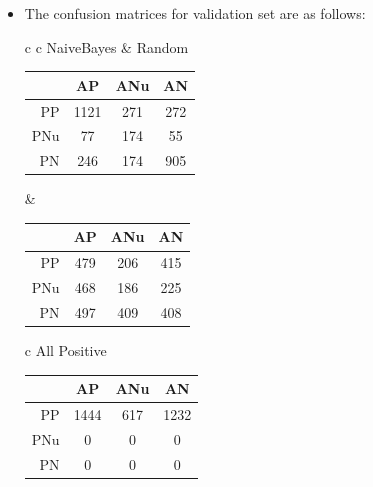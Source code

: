 \documentclass[12pt]{article}
\begin{document}
\begin{enumerate}[label=(\alph*)]
\begin{itemize}
\begin{center}
\begin{tabular}{c}
\begin{tabular}{r|c|c|c}
                    \hline
                    PN & 0 & 0 & 0 \\
                    \hline
                \end{tabular}
            \end{tabular}
            \end{center}
        \item The confusion matrices for validation set are as follows:
        \begin{center}
            \begin{tabular}{c c}
                NaiveBayes & Random \\
                \begin{tabular}{r|c|c|c}
                    & AP & ANu & AN \\
                    \hline
                    PP & 1121 & 271 & 272\\
                    \hline
                    PNu & 77 & 174 & 55 \\
                    \hline
                    PN & 246 & 174 & 905 \\
                    \hline
                \end{tabular} & 
                \begin{tabular}{r|c|c|c}
                    & AP & ANu & AN \\
                    \hline
                    PP & 479 & 206 & 415\\
                    \hline
                    PNu & 468 & 186 & 225 \\
                    \hline
                    PN & 497 & 409 & 408 \\
                    \hline
                \end{tabular}
            \end{tabular}
            \end{center}
            \begin{center}
            \begin{tabular}{c}
                All Positive \\
                \begin{tabular}{r|c|c|c}
                    & AP & ANu & AN \\
                    \hline
                    PP & 1444 & 617 & 1232\\
                    \hline
                    PNu & 0 & 0 & 0 \\
                    \hline
                    PN & 0 & 0 & 0 \\
                    \hline
                \end{tabular}
            \end{tabular}
            \end{center}
    \end{itemize}



\end{enumerate}
\end{document}
